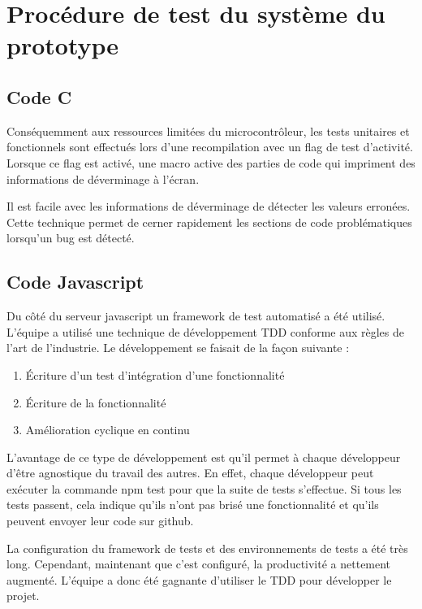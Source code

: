 \section{Procédure de test du système du prototype}
	\subsection{Code C}
	Conséquemment aux ressources limitées du microcontrôleur, les tests unitaires et fonctionnels sont effectués lors d’une recompilation avec un \og flag\fg{} de test d'activité. Lorsque ce \og flag\fg{} est activé, une macro active des parties de code qui impriment des informations de déverminage à l’écran.

	Il est facile avec les informations de déverminage de détecter les valeurs erronées. Cette technique permet de cerner rapidement les sections de code problématiques lorsqu’un bug est détecté.

	\subsection{Code Javascript}
	Du côté du serveur javascript un \og framework\fg{} de test automatisé a été utilisé. L’équipe a utilisé une technique de développement TDD conforme aux règles de l’art de l’industrie. Le développement se faisait de la façon suivante : 
	\begin{enumerate}
		\item Écriture d’un test d’intégration d’une fonctionnalité
		\item Écriture de la fonctionnalité
		\item Amélioration cyclique en continu
	\end{enumerate}%
	
	L’avantage de ce type de développement est qu’il permet à chaque développeur d’être agnostique du travail des autres. En effet, chaque développeur peut exécuter la commande \og npm test \fg{} pour que la suite de tests s’effectue. Si tous les tests passent, cela indique qu’ils n’ont pas brisé une fonctionnalité et qu’ils peuvent envoyer leur code sur github.

	La configuration du \og framework\fg{} de tests et des environnements de tests a été très long. Cependant, maintenant que c’est configuré, la productivité a nettement augmenté. L’équipe a donc été gagnante d’utiliser le TDD pour développer le projet.
		
